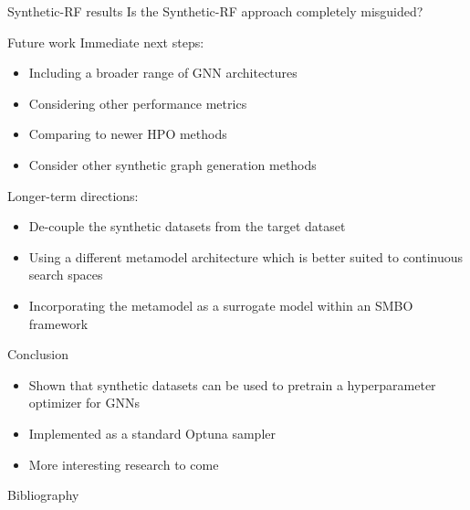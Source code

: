 \documentclass[10pt, aspectratio=169]{beamer}
\begin{document}
\begin{frame}{Synthetic-RF results}
	Is the Synthetic-RF approach completely misguided?

	\vspace{1cm}
	\hspace{1cm}

	\vspace{1cm}
	\hspace{1cm}
\end{frame}

\begin{frame}{Future work}
	Immediate next steps:
	\begin{itemize}
		\item Including a broader range of GNN architectures
		\item Considering other performance metrics
		\item Comparing to newer HPO methods
		\item Consider other synthetic graph generation methods
	\end{itemize}

	Longer-term directions:
	\begin{itemize}
		\item De-couple the synthetic datasets from the target dataset
		\item Using a different metamodel architecture which is better suited to continuous search spaces
		\item Incorporating the metamodel as a surrogate model within an SMBO framework
	\end{itemize}
\end{frame}

\begin{frame}{Conclusion}
	\begin{itemize}
		\item Shown that synthetic datasets can be used to pretrain a hyperparameter optimizer for GNNs
		\item Implemented as a standard Optuna sampler
		\item More interesting research to come
	\end{itemize}
\end{frame}


\begin{frame}
	\titlepage
\end{frame}

\appendix

\begin{frame}[allowframebreaks]{Bibliography}
	\printbibliography
\end{frame}
\end{document}
